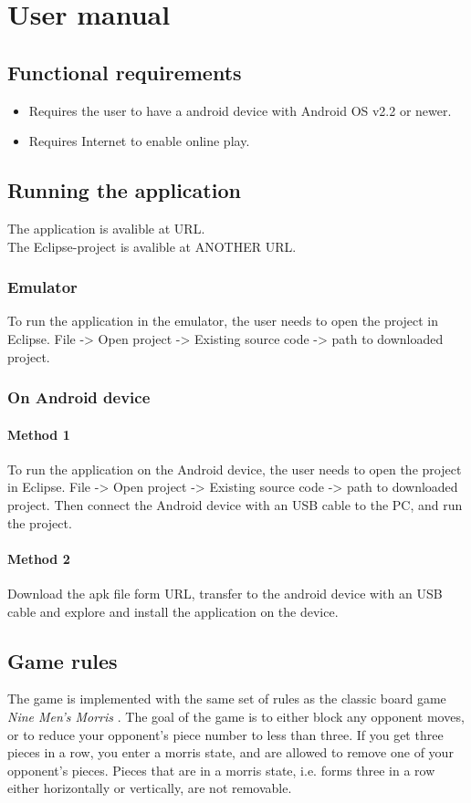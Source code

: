 \section{User manual}

\subsection{Functional requirements}
\begin{itemize}
\item Requires the user to have a android device with Android OS v2.2 or newer.
\item Requires Internet to enable online play.
\end{itemize}

\subsection{Running the application}
The application is avalible at URL. \\
The Eclipse-project is avalible at ANOTHER URL.

\subsubsection{Emulator}
To run the application in the emulator, the user needs to open the project in Eclipse.
File -> Open project -> Existing source code -> path to downloaded project.


\subsubsection{On Android device}
\paragraph*{Method 1}
To run the application on the Android device, the user needs to open the project in Eclipse.
File -> Open project -> Existing source code -> path to downloaded project.
Then connect the Android device with an USB cable to the PC, and run the project.

\paragraph*{Method 2}
Download the apk file form URL, transfer to the android device with an USB cable and explore and install the application on the device.

\subsection{Game rules}
The game is implemented with the same set of rules as the classic board game \emph{Nine Men's Morris} \cite{morris}. The goal of the game is to either block any opponent moves, or to reduce your opponent's piece number to less than three. If you get three pieces in a row, you enter a morris state, and are allowed to remove one of your opponent's pieces. Pieces that are in a morris state, i.e. forms three in a row either horizontally or vertically, are not removable.

